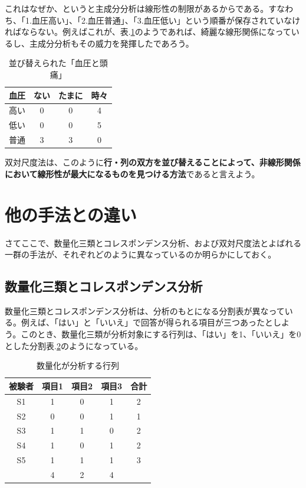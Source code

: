 \documentclass{ltjsbook}
\begin{document}
これはなぜか、というと主成分分析は線形性の制限があるからである。すなわち、「1.血圧高い」、「2.血圧普通」、「3.血圧低い」という順番が保存されていなければならない。例えばこれが、表.\ref{BM2}のようであれば、綺麗な線形関係になっているし、主成分分析もその威力を発揮したであろう。
\begin{table}[h]
    \begin{center}
        \caption{並び替えられた「血圧と頭痛」}
        \begin{tabular}{c|ccc}
            血圧 & ない & たまに & 時々 \\
            \hline
            高い & 0  & 0   & 4  \\
            低い & 0  & 0   & 5  \\
            普通 & 3  & 3   & 0  \\
        \end{tabular}
        \label{BM2}
    \end{center}
\end{table}

双対尺度法は、このように\textbf{行・列の双方を並び替えることによって、非線形関係において線形性が最大になるものを見つける方法}であると言えよう。
\section{他の手法との違い}
さてここで、数量化三類とコレスポンデンス分析、および双対尺度法とよばれる一群の手法が、それぞれどのように異なっているのか明らかにしておく。
\subsection{数量化三類とコレスポンデンス分析}
数量化三類とコレスポンデンス分析は、分析のもとになる分割表が異なっている。例えば、「はい」と「いいえ」で回答が得られる項目が三つあったとしよう。このとき、数量化三類が分析対象にする行列は、「はい」を1、「いいえ」を0とした分割表.\ref{hayashi}のようになっている。
\begin{table}[h]
    \begin{center}
        \caption{数量化が分析する行列}
        \begin{tabular}{c|ccc|c}
            被験者 & 項目1 & 項目2 & 項目3 & 合計 \\
            \hline
            S1  & 1   & 0   & 1   & 2  \\
            S2  & 0   & 0   & 1   & 1  \\
            S3  & 1   & 1   & 0   & 2  \\
            S4  & 1   & 0   & 1   & 2  \\
            S5  & 1   & 1   & 1   & 3  \\
            \hline
                & 4   & 2   & 4   &    \\
        \end{tabular}
        \label{hayashi}
    \end{center}
\end{table}
\end{document}
